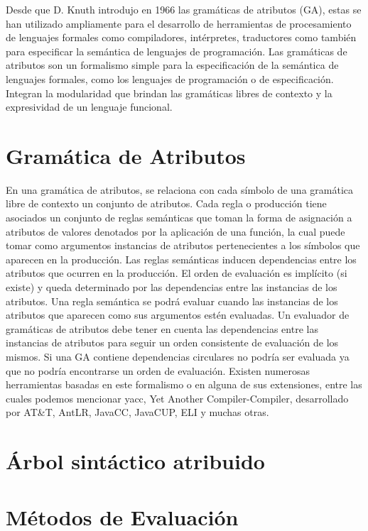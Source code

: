 Desde que D. Knuth introdujo en 1966 las gramáticas de atributos (GA), estas se han utilizado ampliamente para el desarrollo de herramientas de procesamiento de lenguajes formales como compiladores, intérpretes, traductores como también para especificar la semántica de lenguajes de programación. Las gramáticas de atributos son un formalismo simple para la especificación de la semántica de lenguajes formales, como los lenguajes de programación o de especificación. Integran la modularidad que brindan las gramáticas libres de contexto y la expresividad de un lenguaje funcional.

\section{Gramática de Atributos}

En una gramática de atributos, se relaciona con cada símbolo de una gramática libre de contexto un conjunto de atributos. Cada regla o producción tiene asociados un conjunto de reglas semánticas que toman la forma de asignación a atributos de valores denotados por la aplicación de una función, la cual puede tomar como argumentos instancias de atributos pertenecientes a los símbolos que aparecen en la producción.
Las reglas semánticas inducen dependencias entre los atributos que ocurren en la producción. El orden de evaluación es implícito (si existe) y queda determinado por las dependencias entre las instancias de los atributos.
Una regla semántica se podrá evaluar cuando las instancias de los atributos que aparecen como sus argumentos estén evaluadas. Un evaluador de gramáticas de atributos debe tener en cuenta las dependencias entre las instancias de atributos para seguir un orden consistente de evaluación de los mismos.
Si una GA contiene dependencias circulares no podría ser evaluada ya que no podría encontrarse un orden de evaluación. Existen numerosas herramientas basadas en este formalismo o en alguna de sus extensiones, entre las cuales podemos mencionar yacc, Yet Another Compiler-Compiler, desarrollado por AT\&T, AntLR, JavaCC, JavaCUP, ELI y muchas otras.


\section{Árbol sintáctico atribuido}


\section{Métodos de Evaluación}

